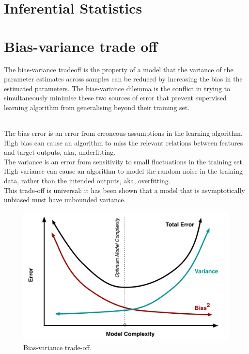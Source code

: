 \section{Inferential Statistics}

\section{Bias-variance trade off}

The bias-variance tradeoff is the property of a model that the variance of the parameter estimates across samples can be reduced by increasing the bias in the estimated parameters. The bias-variance dilemma is the conflict in trying to simultaneously minimise these two sources of error that prevent supervised learning algorithm from generalising beyond their training set. \\\

The bias error is an error from erroneous assumptions in the learning algorithm. High bias can cause an algorithm to miss the relevant relations between features and target outputs, aka, underfitting. \\

The variance is an error from sensitivity to small fluctuations in the training set. High variance can cause an algorithm to model the random noise in the training data, rather than the intended outputs, aka, overfitting. \\

This trade-off is universal: it has been shown that a model that is asymptotically unbiased must have unbounded variance. \\

\begin{figure}[h!]
\begin{center}
	\includegraphics[scale=0.5]{b_v_tradeoff.png}
	\caption[]{Bias-variance trade-off.}
	\label{b_v_tradeoff}
	\end{center}
	\end{figure}

